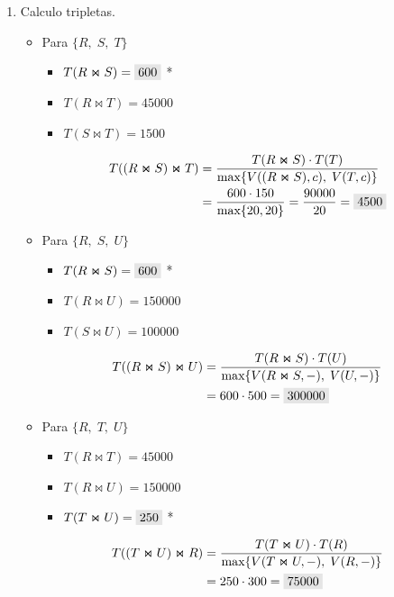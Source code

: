 \documentclass{templateNote}
\newcommand{\newparagraph}{\par\vspace{\baselineskip}\noindent}
\begin{document}
\begin{enumerate}
\begin{enumerate}[label=\arabic*)]
        \item Calculo tripletas.
        \begin{itemize}
            \item Para $\{R, \; S, \; T\}$
            \begin{itemize}
                \item $T(R \Join S) = \colorbox{gray!20}{600}$ *
                \item $T(R \Join T) = 45000$
                \item $T(S \Join T) = 1500$
            \end{itemize}
            \begin{align*}
                T((R \Join S) \Join T) &= \displaystyle\frac{T(R \Join S) \cdot T(T)}{\text{max}\{V((R \Join S), c), \; V(T,c)\}} \\
                &= \frac{600 \cdot 150}{\text{max}\{20, 20\}} = \frac{90000}{20} = \colorbox{gray!20}{4500}
            \end{align*}
            \newparagraph

            \newpage
            \item Para $\{R, \; S, \; U\}$
            \begin{itemize}
                \item $T(R \Join S) = \colorbox{gray!20}{600}$ *
                \item $T(R \Join U) = 150000$
                \item $T(S \Join U) = 100000$
            \end{itemize}
            \begin{align*}
                T((R \Join S) \Join U) &= \displaystyle\frac{T(R \Join S) \cdot T(U)}{\text{max}\{V(R\Join S,-), \; V(U,-)\}} \\
                &= 600 \cdot 500 = \colorbox{gray!20}{300000}
            \end{align*}
            \newparagraph

            \item Para $\{R, \; T, \; U\}$
            \begin{itemize}
                \item $T(R \Join T) = 45000$
                \item $T(R \Join U) = 150000$
                \item $T(T \Join U) = \colorbox{gray!20}{250}$ *
            \end{itemize}
            \begin{align*}
                T((T \Join U) \Join R) &= \displaystyle\frac{T(T \Join U) \cdot T(R)}{\text{max}\{V(T \Join U,-), \; V(R,-)\}} \\
                &= 250 \cdot 300 = \colorbox{gray!20}{75000}
            \end{align*}
            \newparagraph


\end{itemize}
\end{enumerate}
\end{enumerate}
\end{document}

